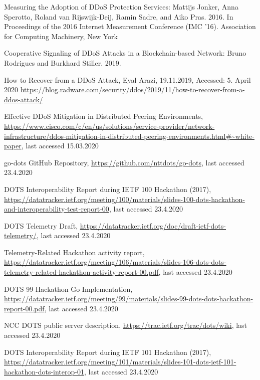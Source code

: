 \begin{thebibliography}{99}
 Measuring the Adoption of DDoS Protection Services: Mattijs Jonker, Anna Sperotto, Roland van Rijswijk-Deij, Ramin Sadre, and Aiko Pras. 2016. In Proceedings of the 2016 Internet Measurement Conference (IMC ’16). Association for Computing Machinery, New York

 Cooperative Signaling of DDoS Attacks in a Blockchain-based Network: Bruno Rodrigues and Burkhard Stiller. 2019. 


How to Recover from a DDoS Attack, Eyal Arazi, 19.11.2019, Accessed: 5. April 2020 \url{https://blog.radware.com/security/ddos/2019/11/how-to-recover-from-a-ddos-attack/}

 Effective DDoS Mitigation in Distributed Peering Environments, \url{https://www.cisco.com/c/en/us/solutions/service-provider/network-infrastructure/ddos-mitigation-in-distributed-peering-environments.html#~white-paper}, last accessed 15.03.2020

 go-dots GitHub Repository, \url{https://github.com/nttdots/go-dots}, last accessed 23.4.2020

 DOTS Interoperability Report during IETF 100 Hackathon (2017), \url{https://datatracker.ietf.org/meeting/100/materials/slides-100-dots-hackathon-and-interoperability-test-report-00}, last accessed 23.4.2020

 DOTS Telemetry Draft, \url{https://datatracker.ietf.org/doc/draft-ietf-dots-telemetry/}, last accessed 23.4.2020

 Telemetry-Related Hackathon activity report, \url{https://datatracker.ietf.org/meeting/106/materials/slides-106-dots-dots-telemetry-related-hackathon-activity-report-00.pdf}, last accessed 23.4.2020

 DOTS 99 Hackathon Go Implementation, \url{https://datatracker.ietf.org/meeting/99/materials/slides-99-dots-dots-hackathon-report-00.pdf}, last accessed 23.4.2020

 NCC DOTS public server description, \url{https://trac.ietf.org/trac/dots/wiki}, last accessed 23.4.2020

 DOTS Interoperability Report during IETF 101 Hackathon (2017), \url{https://datatracker.ietf.org/meeting/101/materials/slides-101-dots-ietf-101-hackathon-dots-interop-01}, last accessed 23.4.2020


\end{thebibliography}
